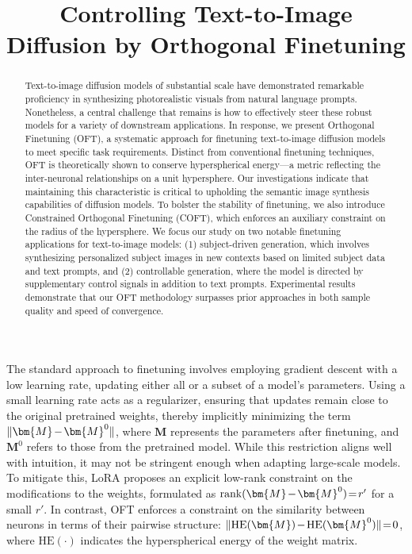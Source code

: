 \title{Controlling Text-to-Image Diffusion by Orthogonal Finetuning}

\begin{abstract}
Text-to-image diffusion models of substantial scale have demonstrated remarkable proficiency in synthesizing photorealistic visuals from natural language prompts. Nonetheless, a central challenge that remains is how to effectively steer these robust models for a variety of downstream applications. In response, we present Orthogonal Finetuning (OFT), a systematic approach for finetuning text-to-image diffusion models to meet specific task requirements. Distinct from conventional finetuning techniques, OFT is theoretically shown to conserve hyperspherical energy—a metric reflecting the inter-neuronal relationships on a unit hypersphere. Our investigations indicate that maintaining this characteristic is critical to upholding the semantic image synthesis capabilities of diffusion models. To bolster the stability of finetuning, we also introduce Constrained Orthogonal Finetuning (COFT), which enforces an auxiliary constraint on the radius of the hypersphere. We focus our study on two notable finetuning applications for text-to-image models: (1) subject-driven generation, which involves synthesizing personalized subject images in new contexts based on limited subject data and text prompts, and (2) controllable generation, where the model is directed by supplementary control signals in addition to text prompts. Experimental results demonstrate that our OFT methodology surpasses prior approaches in both sample quality and speed of convergence.
\end{abstract}

The standard approach to finetuning involves employing gradient descent with a low learning rate, updating either all or a subset of a model's parameters. Using a small learning rate acts as a regularizer, ensuring that updates remain close to the original pretrained weights, thereby implicitly minimizing the term $\thickmuskip=2mu \medmuskip=2mu \| \bm{M} - \bm{M}^0\|$, where $\bm{M}$ represents the parameters after finetuning, and $\bm{M}^0$ refers to those from the pretrained model. While this restriction aligns well with intuition, it may not be stringent enough when adapting large-scale models. To mitigate this, LoRA proposes an explicit low-rank constraint on the modifications to the weights, formulated as $\thickmuskip=2mu \medmuskip=2mu \text{rank}(\bm{M} - \bm{M}^0)=r'$ for a small $r'$. In contrast, OFT enforces a constraint on the similarity between neurons in terms of their pairwise structure: $\thickmuskip=2mu \medmuskip=2mu \| \text{HE}(\bm{M})-\text{HE}(\bm{M}^0) \|=0$, where $\text{HE}(\cdot)$ indicates the hyperspherical energy of the weight matrix. 


